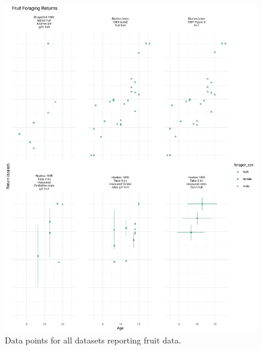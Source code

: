 \begin{figure}[h]
\centering
\includegraphics[width=12cm] {text/images/supplementary/fruit_data.pdf}
\renewcommand{\thefigure}{S\arabic{figure}}
\caption{Data points for all datasets reporting fruit data.}
\label{fig:fruit}
\end{figure}


